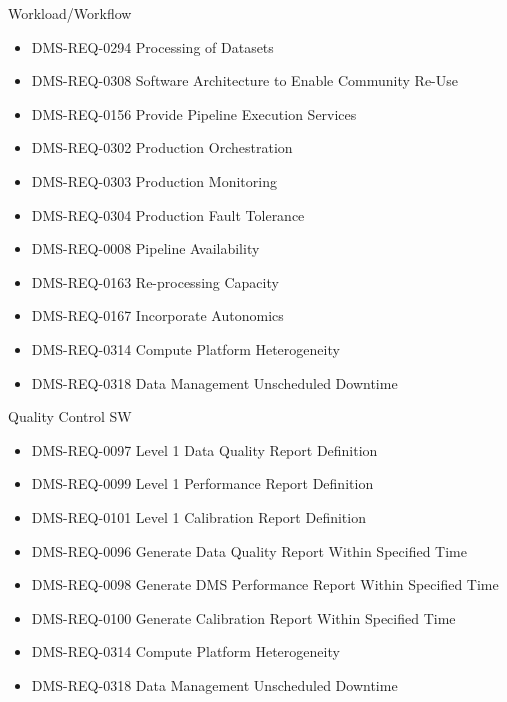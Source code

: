 Workload/Workflow \begin{itemize}
\item DMS-REQ-0294 Processing of Datasets
\item DMS-REQ-0308 Software Architecture to Enable Community Re-Use
\item DMS-REQ-0156 Provide Pipeline Execution Services
\item DMS-REQ-0302 Production Orchestration
\item DMS-REQ-0303 Production Monitoring
\item DMS-REQ-0304 Production Fault Tolerance
\item DMS-REQ-0008 Pipeline Availability
\item DMS-REQ-0163 Re-processing Capacity
\item DMS-REQ-0167 Incorporate Autonomics
\item DMS-REQ-0314 Compute Platform Heterogeneity
\item DMS-REQ-0318 Data Management Unscheduled Downtime
\end{itemize}
Quality Control SW \begin{itemize}
\item DMS-REQ-0097 Level 1 Data Quality Report Definition
\item DMS-REQ-0099 Level 1 Performance Report Definition
\item DMS-REQ-0101 Level 1 Calibration Report Definition
\item DMS-REQ-0096 Generate Data Quality Report Within Specified Time
\item DMS-REQ-0098 Generate DMS Performance Report Within Specified Time
\item DMS-REQ-0100 Generate Calibration Report Within Specified Time
\item DMS-REQ-0314 Compute Platform Heterogeneity
\item DMS-REQ-0318 Data Management Unscheduled Downtime
\end{itemize}
